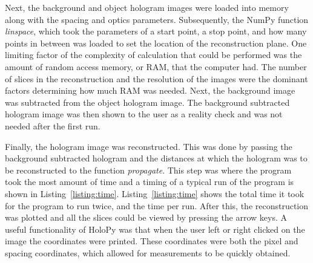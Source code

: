 

Next, the background and object hologram images were
loaded into memory along with the spacing and optics parameters. 
Subsequently, the NumPy
function \emph{linspace}, which took the parameters of a start point, a stop
point, and how many points in between was loaded to set the
location of the reconstruction plane.
One limiting factor of the complexity of calculation that could be performed
was the amount of random access
memory, or RAM, that the computer had. The number of slices in the
reconstruction and the resolution of the images were the dominant factors
determining how much RAM was needed.
Next, the background image was
subtracted from the object hologram image.
%
%
The background subtracted hologram image was then shown to the user as
a reality check and was not needed after the first run.


Finally, the hologram image was
reconstructed. This was done by passing the background subtracted hologram and
the distances at which the hologram was to be reconstructed to the function
\emph{propagate}. This step was where the program took the most amount of time
and a timing
of a typical run of the program is shown in Listing~\ref{listing:time}. 
Listing~\ref{listing:time} shows the total time it took for the program to run
twice, and the time per run.
After this,
the reconstruction was plotted and all the slices could be viewed by pressing the
arrow keys. A useful functionality of HoloPy was that when the user left or right
clicked on the image the coordinates were printed. These coordinates were both
the pixel and spacing coordinates, which allowed for measurements to be quickly
obtained.



